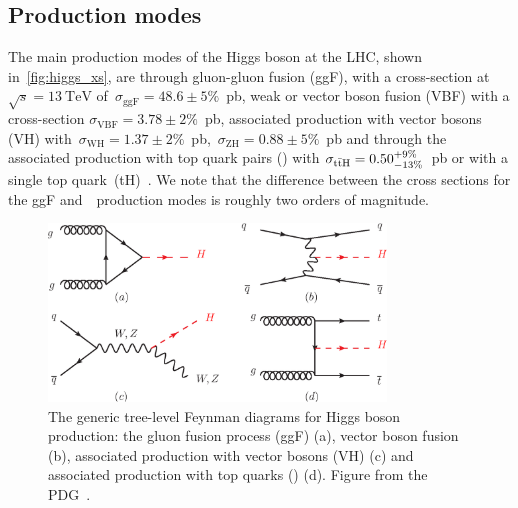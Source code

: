 \subsection{Production modes}
The main production modes of the Higgs boson at the LHC, shown in~\cref{fig:higgs_xs}, are through gluon-gluon fusion (ggF), with a cross-section at $\sqrt{s} = 13~\mathrm{TeV}$ of~$\sigma_{\mathrm{ggF}} = 48.6\pm 5\%$~pb, weak or vector boson fusion (VBF) with a cross-section $\sigma_{\mathrm{VBF}} = 3.78\pm2\%$~pb, associated production with vector bosons (VH) with~$\sigma_{\mathrm{WH}} = 1.37\pm2\%$~pb,~$\sigma_{\mathrm{ZH}} = 0.88\pm5\%$~pb and through the associated production with top quark pairs (\ttH) with $\sigma_{\mathrm{t} \bar{\mathrm{t}} \mathrm{H}} = 0.50^{+9\%}_{-13\%}$~pb or with a single top quark~(tH)~\cite{Patrignani:2016xqp}. We note that the difference between the cross sections for the ggF and~\ttH~production modes is roughly two orders of magnitude.

\begin{figure}
\begin{centering}
\includegraphics[width=0.8\textwidth]{figures/theory/PDG.eps}
\caption[Tree-level Feynman diagrams for Higgs production]{The generic tree-level Feynman diagrams for Higgs boson production: the gluon fusion process (ggF) (a), vector boson fusion (b), associated production with vector bosons (VH) (c) and associated production with top quarks (\ttH) (d). Figure from the PDG~\cite{Patrignani:2016xqp}.}
\label{fig:higgs_production}
\end{centering}
\end{figure}


